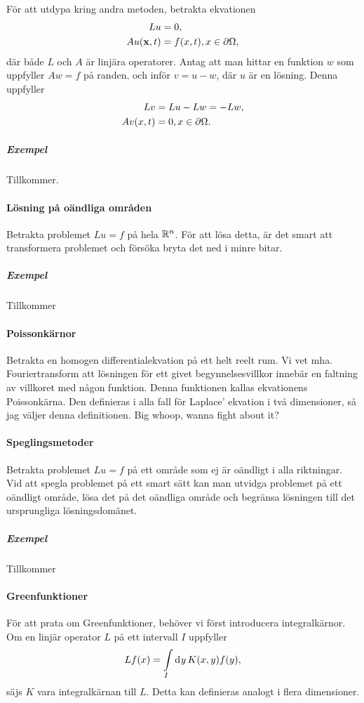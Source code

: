 För att utdypa kring andra metoden, betrakta ekvationen
\begin{align*}
	Lu            &= 0, \\
	Au(\vb{x}, t) &= f(x, t), x\in\partial \Omega,
\end{align*}
där både $L$ och $A$ är linjära operatorer. Antag att man hittar en funktion $w$ som uppfyller $Aw = f$ på randen, och inför $v = u - w$, där $u$ är en lösning. Denna uppfyller
\begin{align*}
	Lv       &= Lu - Lw = -Lw, \\
	Av(x, t) &= 0, x\in\partial \Omega.
\end{align*}

\subparagraph{Exempel}
Tillkommer.

\paragraph{Lösning på oändliga områden}
Betrakta problemet $Lu = f$ på hela $\mathbb{R}^{n}$. För att lösa detta, är det smart att transformera problemet och försöka bryta det ned i minre bitar.

\subparagraph{Exempel}
Tillkommer

\paragraph{Poissonkärnor}
Betrakta en homogen differentialekvation på ett helt reelt rum. Vi vet mha. Fouriertransform att lösningen för ett givet begynnelsesvillkor innebär en faltning av villkoret med någon funktion. Denna funktionen kallas ekvationens Poissonkärna. Den definieras i alla fall för Laplace' ekvation i två dimensioner, så jag väljer denna definitionen. Big whoop, wanna fight about it?

\paragraph{Speglingsmetoder}
Betrakta problemet $Lu = f$ på ett område som ej är oändligt i alla riktningar. Vid att spegla problemet på ett smart sätt kan man utvidga problemet på ett oändligt område, lösa det på det oändliga område och begränsa lösningen till det ursprungliga lösningsdomänet.

\subparagraph{Exempel}
Tillkommer

\paragraph{Greenfunktioner}
För att prata om Greenfunktioner, behöver vi först introducera integralkärnor. Om en linjär operator $L$ på ett intervall $I$ uppfyller
\begin{align*}
	Lf(x) = \int\limits_{I}\dd[]{y}K(x, y)f(y),
\end{align*}
säjs $K$ vara integralkärnan till $L$. Detta kan definieras analogt i flera dimensioner.

